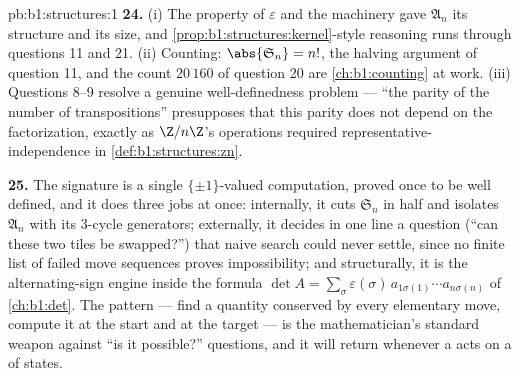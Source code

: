 \begin{solution}{pb:b1:structures:1}
\textbf{24.} (i) The  property of $\varepsilon$ and the
 machinery gave $\mathfrak A_n$ its  structure and
its size, and \cref{prop:b1:structures:kernel}-style reasoning
runs through questions 11 and 21. (ii) Counting:
$\abs{\mathfrak S_n} = n!$, the halving argument of question 11,
and the count $20\,160$ of question 20 are
\cref{ch:b1:counting} at work. (iii) Questions 8--9 resolve a
genuine well-definedness problem --- ``the parity of the number
of transpositions'' presupposes that this parity does not depend
on the factorization, exactly as $\Z/n\Z$'s operations required
representative-independence in \cref{def:b1:structures:zn}.

\textbf{25.} The signature is a single $\{\pm1\}$-valued
computation, proved once to be well defined, and it does three
jobs at once: internally, it cuts $\mathfrak S_n$ in half and
isolates $\mathfrak A_n$ with its $3$-cycle generators;
externally, it decides in one line a question (``can these two
tiles be swapped?'') that naive search could never settle, since
no finite list of failed move sequences proves impossibility; and
structurally, it is the alternating-sign engine inside the
formula $\det A = \sum_\sigma \varepsilon(\sigma)\,
a_{1\sigma(1)}\cdots a_{n\sigma(n)}$ of \cref{ch:b1:det}. The
pattern --- find a quantity conserved by every elementary move,
compute it at the start and at the target --- is the
mathematician's standard weapon against ``is it possible?''
questions, and it will return whenever a  acts on a  of
states.
\end{solution}
